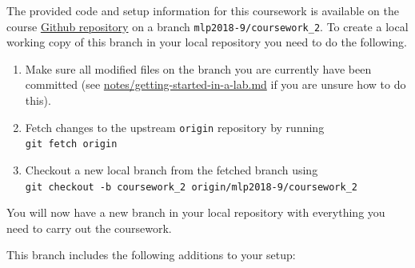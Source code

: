 \documentclass[11pt,]{article}
\begin{document}
The provided code and setup information for this coursework is available on the course
\href{https://github.com/CSTR-Edinburgh/mlpractical/}{Github repository}
on a branch \verb+mlp2018-9/coursework_2+. To create a local working
copy of this branch in your local repository you need to do the
following.

\begin{enumerate}
\def\labelenumi{\arabic{enumi}.}
\itemsep3pt\parskip0pt
\item
  Make sure all modified files on the branch you are currently have been
  committed
  (see \href{https://github.com/CSTR-Edinburgh/mlpractical/blob/mlp2018-9/master/notes/getting-started-in-a-lab.md}{notes/getting-started-in-a-lab.md} if you are unsure how to do this).
\item
  Fetch changes to the upstream \texttt{origin} repository by running\\
  \texttt{git fetch origin}
\item
  Checkout a new local branch from the fetched branch using\\
  \verb+git checkout -b coursework_2 origin/mlp2018-9/coursework_2+
\end{enumerate}

You will now have a new branch in your local repository with everything you need to carry out the coursework.

This branch includes the following additions to your setup:
\end{document}
